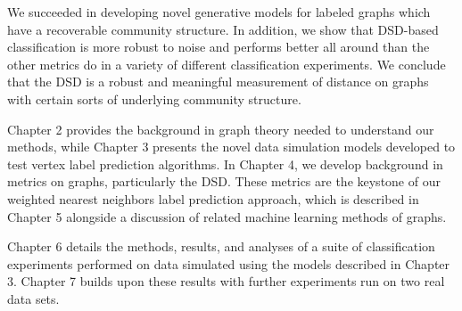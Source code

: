 We succeeded in developing novel generative models for labeled graphs which have a recoverable
community structure. In addition, we show that DSD-based classification is more robust to noise and
performs better all around than the other metrics do in a variety of different classification
experiments. We conclude that the DSD is a robust and meaningful measurement of distance on graphs
with certain sorts of underlying community structure.

Chapter 2 provides the background in graph theory needed to understand our methods, while Chapter 3
presents the novel data simulation models developed to test vertex label prediction algorithms. In
Chapter 4, we develop background in metrics on graphs, particularly the DSD. These metrics are the
keystone of our weighted nearest neighbors label prediction approach, which is described in Chapter
5 alongside a discussion of related machine learning methods of graphs.

Chapter 6 details the methods, results, and analyses of a suite of classification experiments
performed on data simulated using the models described in Chapter 3. Chapter 7 builds upon these
results with further experiments run on two real data sets.


